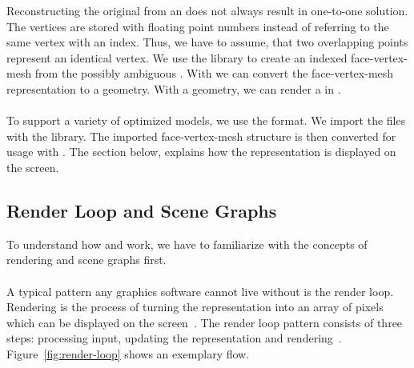 \documentclass[../ClassicThesis.tex]{subfiles}
\begin{document}

Reconstructing the original {\threedmodel} from an {\stlfile} does not
always result in one-to-one solution. The vertices are stored with
floating point numbers instead of referring to the same vertex with an
index. Thus, we have to assume, that two overlapping points represent
an identical vertex. We use the library {\meshlib} to create an
indexed face-vertex-mesh from the possibly ambiguous {\stlfile}. With
{\meshlib} we can convert the face-vertex-mesh representation to a
{\threejs} geometry. With a {\threejs} geometry, we can render a
{\threedmodel} in {\convertify}.\\
\\
To support a variety of {\threedprinter} optimized models, we use the
{\stlfile} format. We import the files with the {\meshlib} library.
The imported face-vertex-mesh structure is then converted for usage
with {\threejs}. The section below, explains how the {\threejs}
representation is displayed on the screen.

\subsection{Render Loop and Scene Graphs}
\label{sub:render-and-graph}

To understand how {\convertify} and {\platener} work, we have to
familiarize with the concepts of rendering and scene graphs first. \\
\\
A typical pattern any graphics software cannot live without is the
render loop. Rendering is the process of turning the {\threedmodel}
representation into an array of pixels which can be displayed on the
screen~\cite[p.~2]{intro-cg}. The render loop pattern consists of
three steps: processing input, updating the {\threedmodel}
representation and rendering~\cite{gamedev-gameloop}.
Figure~\ref{fig:render-loop} shows an exemplary flow.\\
\end{document}
